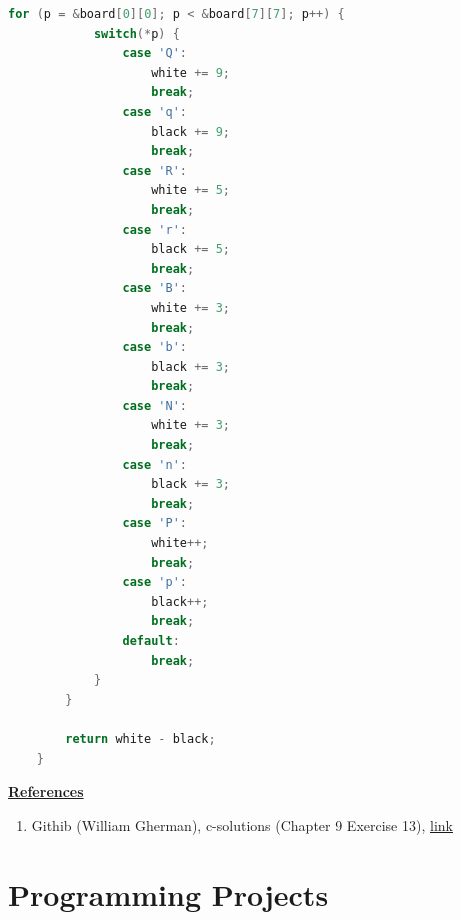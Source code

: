 \documentclass[12pt]{article}
\begin{document}
\begin{enumerate}[1.]
\begin{lstlisting}[language=c]
        for (p = &board[0][0]; p < &board[7][7]; p++) {
            switch(*p) {
                case 'Q':
                    white += 9;
                    break;
                case 'q':
                    black += 9;
                    break;
                case 'R':
                    white += 5;
                    break;
                case 'r':
                    black += 5;
                    break;
                case 'B':
                    white += 3;
                    break;
                case 'b':
                    black += 3;
                    break;
                case 'N':
                    white += 3;
                    break;
                case 'n':
                    black += 3;
                    break;
                case 'P':
                    white++;
                    break;
                case 'p':
                    black++;
                    break;
                default:
                    break;
            }
        }

        return white - black;
    }
\end{lstlisting}

    \bigskip

    \underline{\textbf{References}}

    \begin{enumerate}[1)]
        \item Githib (William Gherman), c-solutions (Chapter 9 Exercise 13), \href{https://github.com/williamgherman/c-solutions/tree/master/09/exercises/13}{link}
    \end{enumerate}
\end{enumerate}

\section{Programming Projects}
\end{document}
